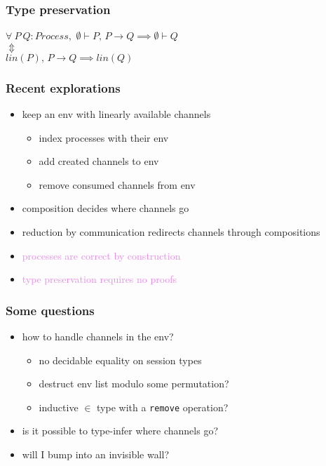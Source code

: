 \documentclass{beamer}
\begin{document}
\begin{frame}
    \frametitle{Type preservation}
    \LARGE
    \centering
    $\forall \ P \ Q : Process,$ 
    \vfill
    $\emptyset \vdash P, \,P \rightarrow Q \implies \emptyset \vdash Q$ \\
    $\Updownarrow$ \\
    $lin(P), \, P \rightarrow Q \implies lin(Q)$ \\
\end{frame}

\begin{frame}
    \frametitle{Recent explorations}
    \begin{itemize}
        \item keep an env with linearly available channels
        \begin{itemize}
            \item index processes with their env
            \item add created channels to env
            \item remove consumed channels from env
        \end{itemize}
        \item composition decides where channels go
        \item reduction by communication redirects channels through compositions
        \item \textcolor{violet}{processes are correct by construction}
        \item \textcolor{violet}{type preservation requires no proofs}
    \end{itemize}
\end{frame}

\begin{frame}
    \frametitle{Some questions}
    \begin{itemize}
        \item how to handle channels in the env?
        \begin{itemize}
            \item no decidable equality on session types
            \item destruct env list modulo some permutation?
            \item inductive $\in$ type with a \texttt{remove} operation?
        \end{itemize}
        \item is it possible to type-infer where channels go?
        \item will I bump into an invisible wall?
    \end{itemize}
\end{frame}
\end{document}
